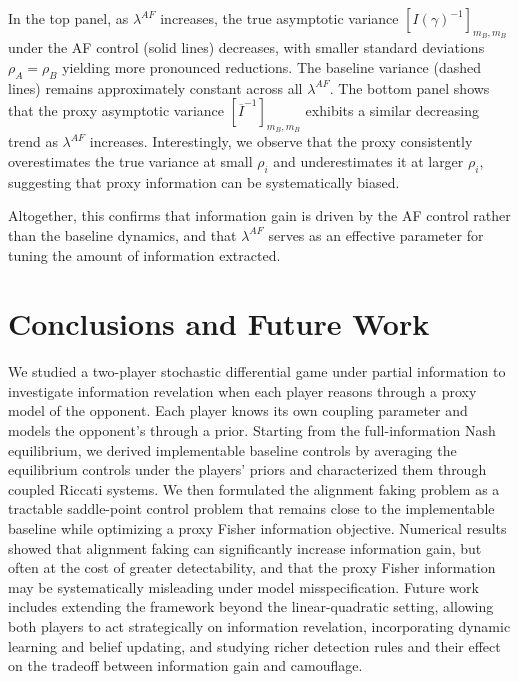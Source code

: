 \documentclass[letterpaper, 10 pt, conference]{ieeeconf}
\newcommand{\rh}[1]{\textcolor{purple}{\textsf{[RH: #1]}}}
\newcommand{\dr}[1]{\textcolor{red}{\textsf{[DR: #1]}}}
\begin{document}
In the top panel, as $ \lambda^{AF}$ increases, the true asymptotic variance $[I(\gamma)^{-1}]_{m_B, m_B}$ under the AF control (solid lines) decreases, with smaller standard deviations $\rho_A = \rho_B$ yielding more pronounced reductions.  The baseline variance (dashed lines) remains approximately constant across all $ \lambda^{AF}$.   The bottom panel shows that the proxy asymptotic variance $[\overline{I}^{-1}]_{m_B,m_B}$ exhibits a similar decreasing trend as $ \lambda^{AF}$ increases.  Interestingly, we observe that the proxy consistently overestimates the true variance at small $\rho_i$ and underestimates it at larger $\rho_i$, suggesting that proxy information can be systematically biased. %

Altogether, this confirms that information gain is driven by the AF control rather than the baseline dynamics, and that 
\(\lambda^{AF}\) serves as an effective parameter for tuning the amount of information extracted.

\section{Conclusions and Future Work}

We studied a two-player stochastic differential game under partial information to investigate information revelation when each player reasons through a proxy model of the opponent. Each player knows its own coupling parameter and models the opponent's through a prior. Starting from the full-information Nash equilibrium, we derived implementable baseline controls by averaging the equilibrium controls under the players' priors and characterized them through coupled Riccati systems. We then formulated the alignment faking problem as a tractable saddle-point control problem that remains close to the implementable baseline while optimizing a proxy Fisher information objective. Numerical results showed that alignment faking can significantly increase information gain, but often at the cost of greater detectability, and that the proxy Fisher information may be systematically misleading under model misspecification. Future work includes extending the framework beyond the linear-quadratic setting, allowing both players to act strategically on information revelation, incorporating dynamic learning and belief updating, and studying richer detection rules and their effect on the tradeoff between information gain and camouflage.
\end{document}
